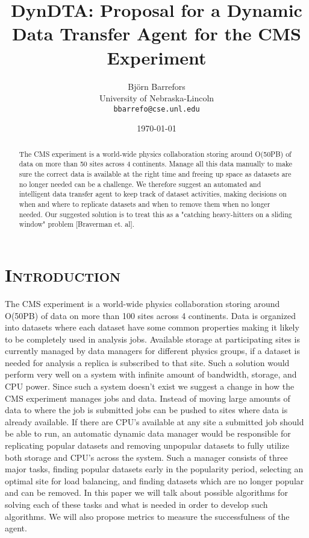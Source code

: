 \documentclass[11pt,a4page]{article}
\title{\textbf{\fontfamily{\sfdefault}\selectfont DynDTA: Proposal for a Dynamic Data Transfer Agent for the CMS Experiment}}
\author{Bj\"{o}rn Barrefors\\
  University of Nebraska-Lincoln\\
  \texttt{bbarrefo@cse.unl.edu}}
\date{\today}
\begin{document}
\maketitle

\begin{abstract}

	The CMS experiment is a world-wide physics collaboration storing around O(50PB) of data on more than 50 sites across 4 continents. Manage all this data manually to make sure the correct data is available at the right time and freeing up space as datasets are no longer needed can be a challenge. We therefore suggest an automated and intelligent data transfer agent to keep track of dataset activities, making decisions on when and where to replicate datasets and when to remove them when no longer needed. Our suggested solution is to treat this as a "catching heavy-hitters on a sliding window" problem [Braverman et. al].

\end{abstract}


\section{\textsc{Introduction}}

  The CMS experiment is a world-wide physics collaboration storing around O(50PB) of data on more than 100 sites across 4 continents. Data is organized into datasets where each dataset have some common properties making it likely to be completely used in analysis jobs. Available storage at participating sites is currently managed by data managers for different physics groups, if a dataset is needed for analysis a replica is subscribed to that site. Such a solution would perform very well on a system with infinite amount of bandwidth, storage, and CPU power. Since such a system doesn't exist we suggest a change in how the CMS experiment manages jobs and data. Instead of moving large amounts of data to where the job is submitted jobs can be pushed to sites where data is already available. If there are CPU's available at any site a submitted job should be able to run, an automatic dynamic data manager would be responsible for replicating popular datasets and removing unpopular datasets to fully utilize both storage and CPU's across the system. Such a manager consists of three major tasks, finding popular datasets early in the popularity period, selecting an optimal site for load balancing, and finding datasets which are no longer popular and can be removed. In this paper we will talk about possible algorithms for solving each of these tasks and what is needed in order to develop such algorithms. We will also propose metrics to measure the successfulness of the agent.
\end{document}
